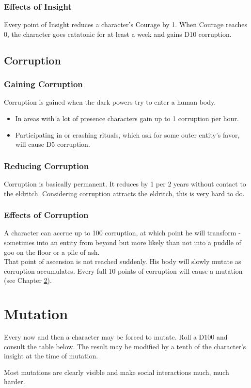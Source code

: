 \documentclass[12pt,a4paper,openany]{book}
\begin{document}
	\subsection{Effects of Insight}
	Every point of Insight reduces a character's Courage by 1. When Courage reaches 0, the character goes catatonic for at least a week and gains D10 corruption.
	
	\section{Corruption}
	\subsection{Gaining Corruption}
	Corruption is gained when the dark powers try to enter a human body. 
	\vspace{-8mm}
	\begin{itemize}
		\setlength\itemsep{-8mm}
		\item In areas with a lot of presence characters gain up to 1 corruption per hour.
		\item Participating in or crashing rituals, which ask for some outer entity's favor, will cause D5 corruption.
	\end{itemize}
	\subsection{Reducing Corruption}
	Corruption is basically permanent. It reduces by 1 per 2 years without contact to the eldritch. Considering corruption attracts the eldritch, this is very hard to do.
	\subsection{Effects of Corruption}
	A character can accrue up to 100 corruption, at which point he will transform - sometimes into an entity from beyond but more likely than not into a puddle of goo on the floor or a pile of ash.\\
	That point of ascension is not reached suddenly. His body will slowly mutate as corruption accumulates. Every full 10 points of corruption will cause a mutation (see Chapter \ref{ch:mutation}).
	
	\chapter{Mutation}
	\label{ch:mutation}
	Every now and then a character may be forced to mutate. Roll a D100 and consult the table below. The result may be modified by a tenth of the character's insight at the time of mutation.
	\par
	Most mutations are clearly visible and make social interactions much, much harder.
	\par
	\begin{multicols}{2}
		\begin{enumerate}
			\setlength\itemsep{-10mm}
		\end{enumerate}
	\end{multicols}
	
\end{document}
